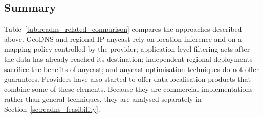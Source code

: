 \documentclass[
A4paper,                %
twoside,                %
openright,              %
chapterprefix=true,     %
12pt,                   %
headings=normal,        %
titlepage=on            %
]{book}
\begin{document}
\subsection{Summary}
\label{sc:rcadns_related_summary}

Table~\ref{tab:rcadns_related_comparison} compares the approaches described above. GeoDNS and regional IP anycast rely on location inference and on a mapping policy controlled by the provider; application-level filtering acts after the data has already reached its destination; independent regional deployments sacrifice the benefits of anycast; and anycast optimisation techniques do not offer guarantees. Providers have also started to offer data localisation products that combine some of these elements. Because they are commercial implementations rather than general techniques, they are analysed separately in Section~\ref{sc:rcadns_feasibility}.
\end{document}
